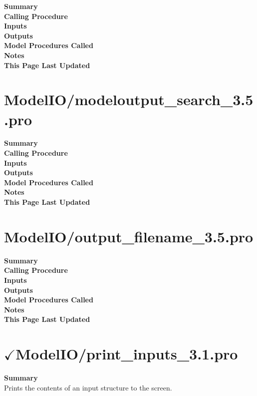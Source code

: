 \documentclass[11pt]{article}
\newcommand\descrip[1]{\textsf{\textbf{\large{#1}}}\\}
\begin{document}
\descrip{Summary}

\descrip{Calling Procedure}

\descrip{Inputs}

\descrip{Outputs}

\descrip{Model Procedures Called}

\descrip{Notes}

\descrip{This Page Last Updated}

\clearpage

\section{ModelIO/modeloutput\_search\_3.5.pro} \label{sec:modeloutput_search}

\descrip{Summary}

\descrip{Calling Procedure}

\descrip{Inputs}

\descrip{Outputs}

\descrip{Model Procedures Called}

\descrip{Notes}

\descrip{This Page Last Updated}

\clearpage

\section{ModelIO/output\_filename\_3.5.pro} \label{sec:output_filename}

\descrip{Summary}

\descrip{Calling Procedure}

\descrip{Inputs}

\descrip{Outputs}

\descrip{Model Procedures Called}

\descrip{Notes}

\descrip{This Page Last Updated}

\clearpage

\section{$\checkmark$ModelIO/print\_inputs\_3.1.pro} \label{sec:print_inputs}

\descrip{Summary}
Prints the contents of an input structure to the screen.
\end{document}
